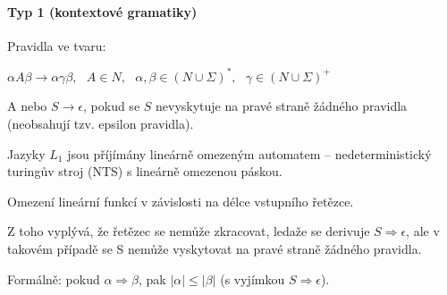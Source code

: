 \paragraph*{Typ 1 (kontextové gramatiky)} \begin{compactitem}
    \item Pravidla ve tvaru: \begin{compactitem}
        \item $\alpha A \beta \rightarrow \alpha \gamma \beta,~~~ A \in N,~~~ \alpha, \beta \in (N \cup \Sigma)^*,~~~ \gamma \in (N \cup \Sigma)^+$
        \item A nebo $S \rightarrow \epsilon$, pokud se $S$ nevyskytuje na pravé straně žádného pravidla (neobsahují tzv. epsilon pravidla).
    \end{compactitem}

    \item Jazyky $L_1$ jsou příjímány lineárně omezeným automatem -- nedeterministický turingův stroj (NTS) s lineárně omezenou páskou. \begin{compactitem}
        \item Omezení lineární funkcí v závislosti na délce vstupního řetězce.
        \item Z toho vyplývá, že řetězec se nemůže zkracovat, ledaže se derivuje $S \Rightarrow \epsilon$, ale v takovém případě se S nemůže vyskytovat na pravé straně žádného pravidla.
        \item Formálně: pokud $\alpha \Rightarrow \beta$, pak $|\alpha| \leq |\beta|$ (s vyjímkou $S \Rightarrow \epsilon$).
    \end{compactitem}
\end{compactitem}

